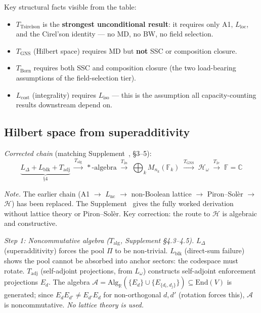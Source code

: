 \documentclass[11pt]{article}
\begin{document}
\medskip\noindent Key structural facts visible from the table:
\begin{itemize}[nosep,leftmargin=2em]
\item $T_{\mathrm{Tsirelson}}$ is the \textbf{strongest unconditional result}: it requires only A1, $L_{\mathrm{loc}}$, and the Cirel'son identity --- no MD, no BW, no field selection.
\item $T_{\mathrm{GNS}}$ (Hilbert space) requires MD but \textbf{not} SSC or composition closure.
\item $T_{\mathrm{Born}}$ requires both SSC and composition closure (the two load-bearing assumptions of the field-selection tier).
\item $L_{\mathrm{cost}}$ (integrality) requires $L_{\mathrm{iso}}$ — this is the assumption all capacity-counting results downstream depend on.
\end{itemize}

\subsection{Hilbert space from superadditivity}
\label{app:hilbert}

\begin{tcolorbox}[apfbox, title={Chain: $L_\Delta$ (Superadditivity) $\to$ Noncommutative Algebra $\to$ Hilbert Space}]
\textit{Corrected chain} (matching Supplement~\cite{Supp}, §3--5):
\begin{equation}
\underbrace{L_\Delta + L_{\mathrm{blk}} + T_{\mathrm{adj}}}_{§4} \;\xrightarrow{T_{\mathrm{alg}}}\; *\text{-algebra} \;\xrightarrow{T_{2a}}\; \bigoplus_k M_{n_k}(\mathbb{F}_k) \;\xrightarrow{T_{\mathrm{GNS}}}\; \mathcal{H}_\omega \;\xrightarrow{T_{2c}}\; \mathbb{F} = \mathbb{C}
\end{equation}

\noindent\textit{Note.}  The earlier chain (A1 $\to$ $L_{\mathrm{nc}}$ $\to$ non-Boolean lattice $\to$ Piron--Sol\`er $\to$ $\mathcal{H}$) has been replaced.  The Supplement~\cite{Supp} gives the fully worked derivation without lattice theory or Piron--Sol\`er.  Key correction: the route to $\mathcal{H}$ is algebraic and constructive.
\end{tcolorbox}

\noindent\textit{Step 1: Noncommutative algebra ($T_{\mathrm{alg}}$, Supplement §4.3--4.5).}\quad
$L_\Delta$ (superadditivity) forces the pool $\Pi$ to be non-trivial.  $L_{\mathrm{blk}}$ (direct-sum failure) shows the pool cannot be absorbed into anchor sectors: the codespace must rotate.  $T_{\mathrm{adj}}$ (self-adjoint projections, from $L_\omega$) constructs self-adjoint enforcement projections $E_d$.  The algebra $\mathcal{A} = \mathrm{Alg}_{\mathbb{R}}(\{E_d\} \cup \{E_{\{d_i,d_j\}}\}) \subseteq \mathrm{End}(V)$ is generated; since $E_d E_{d'} \ne E_{d'} E_d$ for non-orthogonal $d, d'$ (rotation forces this), $\mathcal{A}$ is noncommutative.  \textit{No lattice theory is used.}
\end{document}
